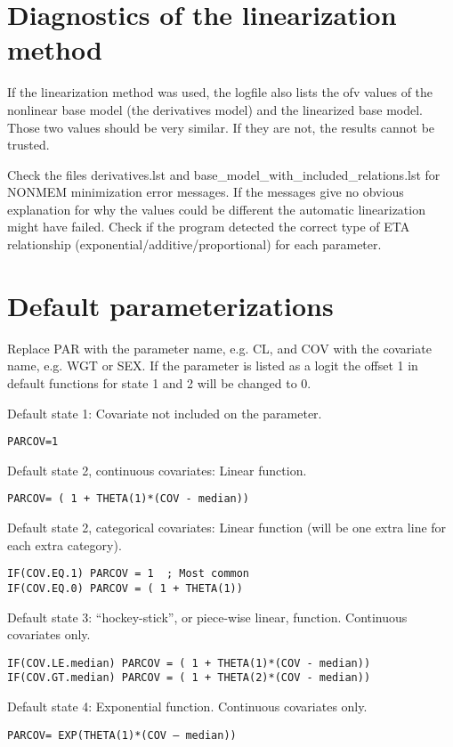 \section{Diagnostics of the linearization method}
If the linearization method was used, the logfile also lists the ofv values of the nonlinear base model (the derivatives model) and the linearized base model. Those two values should be very similar. If they are not, the results cannot be trusted. 

Check the files derivatives.lst and base\_model\_with\_included\_relations.lst for NONMEM minimization error messages. If the messages give no obvious explanation for why the values could be different the automatic linearization might have failed. Check if the program detected the correct type of ETA relationship (exponential/additive/proportional) for each parameter. 

\section{Default parameterizations}
Replace PAR with the parameter name, e.g. CL, and COV with the covariate name, e.g. WGT or SEX. If the parameter is listed as a logit the offset 1 in default functions for state 1 and 2 will be changed to 0.

Default state 1: Covariate not included on the parameter.
\begin{verbatim}
PARCOV=1
\end{verbatim}

Default state 2, continuous covariates: Linear function.
\begin{verbatim}
PARCOV= ( 1 + THETA(1)*(COV - median))
\end{verbatim}

Default state 2, categorical covariates: Linear function (will be one extra line for each extra category).
\begin{verbatim}
IF(COV.EQ.1) PARCOV = 1  ; Most common
IF(COV.EQ.0) PARCOV = ( 1 + THETA(1))
\end{verbatim}

Default state 3: “hockey-stick”, or piece-wise linear, function. Continuous covariates only.
\begin{verbatim}
IF(COV.LE.median) PARCOV = ( 1 + THETA(1)*(COV - median))
IF(COV.GT.median) PARCOV = ( 1 + THETA(2)*(COV - median))
\end{verbatim}

Default state 4: Exponential function. Continuous covariates only.
\begin{verbatim}
PARCOV= EXP(THETA(1)*(COV – median))
\end{verbatim}

